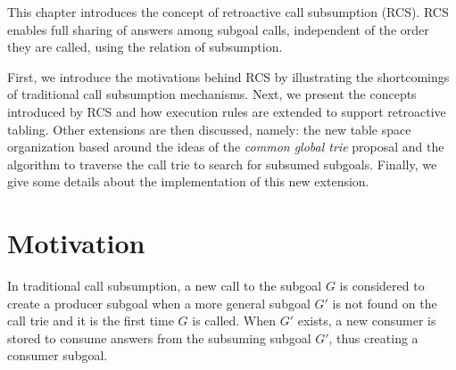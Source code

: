 This chapter introduces the concept of retroactive call subsumption (RCS). RCS
enables full sharing of answers among subgoal calls, independent of the order they are called,
using the relation of subsumption.

First, we introduce the motivations behind RCS by illustrating the shortcomings of traditional call
subsumption mechanisms. Next, we present the concepts introduced by RCS and how execution
rules are extended to support retroactive tabling. Other extensions are then discussed, namely:
the new table space organization based around the ideas of the \textit{common global trie} proposal
\cite{CostaJ-08} and the algorithm to traverse the call trie to search for subsumed subgoals. Finally, we
give some details about the implementation of this new extension.

\section{Motivation}

In traditional call subsumption, a new call to the subgoal $G$ is considered to create a producer subgoal
when a more general subgoal $G'$ is not found on the call trie and it is the first time $G$ is called.
When $G'$ exists, a new consumer is stored to consume answers from the subsuming subgoal $G'$, thus creating
a consumer subgoal.

